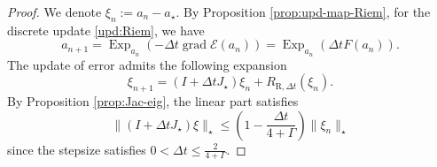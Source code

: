 \documentclass[11pt]{article}
\theoremstyle{plain}
\theoremstyle{definition}
\theoremstyle{remark}
\newcommand{\grad}{\operatorname{grad}}
\newcommand{\Exp}{\operatorname{Exp}}
\begin{document}
\begin{proof}
    We denote $\xi_n := a_n - a_\star$. By Proposition \ref{prop:upd-map-Riem}, for the discrete update \eqref{upd:Riem}, we have
    \begin{equation*}
        a_{n+1} = \Exp_{a_n} (-\Delta t \grad \mathcal{E} (a_n)) = \Exp_{a_n} (\Delta t F(a_n)).
    \end{equation*}
    The update of error admits the following expansion
    \begin{equation*}
        \xi_{n+1} = (I + \Delta t J_\star) \xi_n + R_{\mathrm{R}, \Delta t} (\xi_n).
    \end{equation*}
    By Proposition \ref{prop:Jac-eig}, the linear part satisfies \begin{equation*}
        \| (I + \Delta t J_\star) \xi \|_\star \leq \left( 1 - \frac{\Delta t}{4 + \Gamma} \right) \|\xi_n\|_\star
    \end{equation*}
    since the stepsize satisfies $0 < \Delta t \leq \frac{2}{4 + \Gamma}$.


\end{proof}
\end{document}
